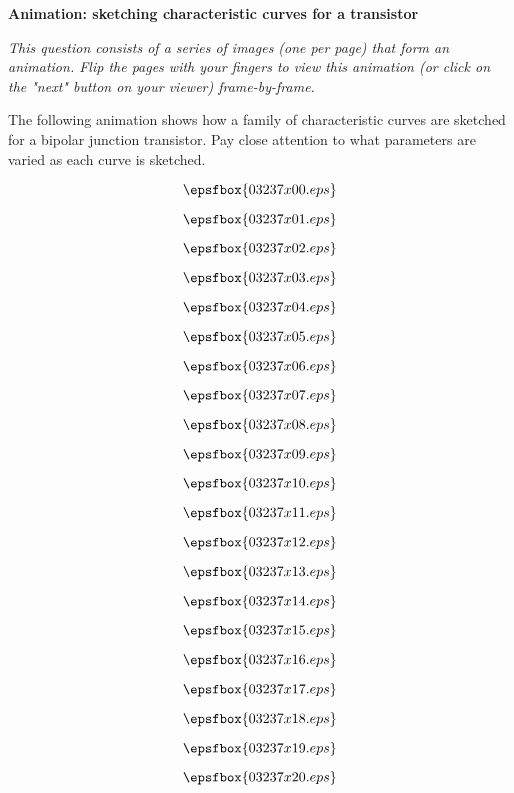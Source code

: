 

\centerline{\bf Animation: sketching characteristic curves for a transistor}

\vskip 10pt

{\it This question consists of a series of images (one per page) that form an animation.  Flip the pages with your fingers to view this animation (or click on the "next" button on your viewer) frame-by-frame.}

\vskip 10pt

The following animation shows how a family of characteristic curves are sketched for a bipolar junction transistor.  Pay close attention to what parameters are varied as each curve is sketched.

\vfil \eject
$$\epsfbox{03237x00.eps}$$

\vfil \eject
$$\epsfbox{03237x01.eps}$$

\vfil \eject
$$\epsfbox{03237x02.eps}$$

\vfil \eject
$$\epsfbox{03237x03.eps}$$

\vfil \eject
$$\epsfbox{03237x04.eps}$$

\vfil \eject
$$\epsfbox{03237x05.eps}$$

\vfil \eject
$$\epsfbox{03237x06.eps}$$

\vfil \eject
$$\epsfbox{03237x07.eps}$$

\vfil \eject
$$\epsfbox{03237x08.eps}$$

\vfil \eject
$$\epsfbox{03237x09.eps}$$

\vfil \eject
$$\epsfbox{03237x10.eps}$$

\vfil \eject
$$\epsfbox{03237x11.eps}$$

\vfil \eject
$$\epsfbox{03237x12.eps}$$

\vfil \eject
$$\epsfbox{03237x13.eps}$$

\vfil \eject
$$\epsfbox{03237x14.eps}$$

\vfil \eject
$$\epsfbox{03237x15.eps}$$

\vfil \eject
$$\epsfbox{03237x16.eps}$$

\vfil \eject
$$\epsfbox{03237x17.eps}$$

\vfil \eject
$$\epsfbox{03237x18.eps}$$

\vfil \eject
$$\epsfbox{03237x19.eps}$$

\vfil \eject
$$\epsfbox{03237x20.eps}$$

